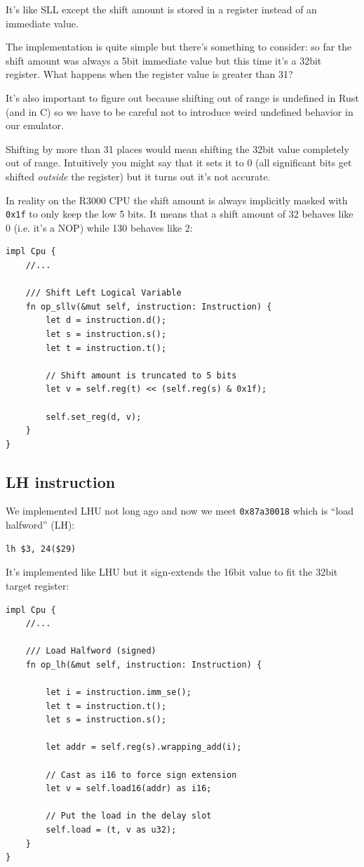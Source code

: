 \documentclass[a4paper]{article}
\newcommand{\code}[1] {\texttt{#1}}
\begin{document}
It's like SLL except the shift amount is stored in a register instead
of an immediate value.

The implementation is quite simple but there's something to consider:
so far the shift amount was always a 5bit immediate value but this
time it's a 32bit register. What happens when the register value is
greater than 31?

It's also important to figure out because shifting out of range is
undefined in Rust (and in C) so we have to be careful not to introduce
weird undefined behavior in our emulator.

Shifting by more than 31 places would mean shifting the 32bit value
completely out of range. Intuitively you might say that it sets it to
0 (all significant bits get shifted \emph{outside} the register) but
it turns out it's not accurate.

In reality on the R3000 CPU the shift amount is always implicitly
masked with \texttt{0x1f} to only keep the low 5 bits. It means that
a shift amount of 32 behaves like 0 (i.e. it's a NOP) while 130
behaves like 2:

\begin{lstlisting}
impl Cpu {
    //...

    /// Shift Left Logical Variable
    fn op_sllv(&mut self, instruction: Instruction) {
        let d = instruction.d();
        let s = instruction.s();
        let t = instruction.t();

        // Shift amount is truncated to 5 bits
        let v = self.reg(t) << (self.reg(s) & 0x1f);

        self.set_reg(d, v);
    }
}
\end{lstlisting}

\subsection{LH instruction}

We implemented LHU not long ago and now we meet \code{0x87a30018}
which is ``load halfword'' (LH):

\begin{lstlisting}[language=assembly]
lh $3, 24($29)
\end{lstlisting}

It's implemented like LHU but it sign-extends the 16bit value to fit
the 32bit target register:

\begin{lstlisting}
impl Cpu {
    //...

    /// Load Halfword (signed)
    fn op_lh(&mut self, instruction: Instruction) {

        let i = instruction.imm_se();
        let t = instruction.t();
        let s = instruction.s();

        let addr = self.reg(s).wrapping_add(i);

        // Cast as i16 to force sign extension
        let v = self.load16(addr) as i16;

        // Put the load in the delay slot
        self.load = (t, v as u32);
    }
}
\end{lstlisting}
\end{document}

